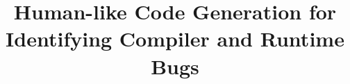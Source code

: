 



\title{Human-like Code Generation for Identifying Compiler and Runtime Bugs}

\date{}
\maketitle

\thispagestyle{empty}









